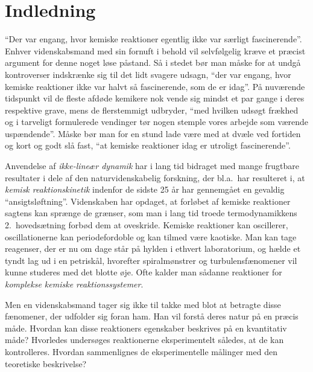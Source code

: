 \chapter*{Indledning}
{\protect{}}
\label{cha:Indledning}
``Der var engang, hvor kemiske reaktioner egentlig ikke var
s{\ae}rligt fasci\-ner\-ende''. Enhver videnskabsmand med sin
fornuft i behold vil selvf{\o}lgelig kr{\ae}ve et
pr{\ae}cist argument for denne noget l{\o}se p{\aa}stand.
S{\aa} i stedet b{\o}r man m{\aa}ske for at undg{\aa}
kontroverser indskr{\ae}nke sig til det lidt svagere
udsagn, ``der var engang, hvor kemiske reaktioner ikke var
halvt s{\aa} fascinerende, som de er idag''. P{\aa}
nuv{\ae}rende tidspunkt vil de fleste afd{\o}de kemikere
nok vende sig mindst et par gange i deres respektive grave,
mens de flerstemmigt udbryder, ``med hvilken uds{\o}gt
fr{\ae}khed og i tarveligt formulerede vendinger t{\o}r
nogen stemple vores arbejde som v{\ae}rende
usp{\ae}ndende''. M{\aa}ske b{\o}r man for en stund lade
v{\ae}re med at dv{\ae}le ved fortiden og kort og godt sl{\aa}
fast, ``at kemiske reaktioner idag er utroligt
fascinerende''.

\vspace{4.0mm}
Anvendelse af {\em ikke-line{\ae}r dynamik\/} har i lang
tid bidraget med mange frugtbare resultater i dele af den
naturvidenskabelig forskning, der bl.a.\ har resulteret i,
at {\em kemisk reaktionskinetik\/} indenfor de sidste 25
{\aa}r har gennemg{\aa}et en gevaldig
``ansigtsl{\o}ftning''. Videnskaben har opdaget, at
forl{\o}bet af kemiske reaktioner sagtens kan spr{\ae}nge
de gr{\ae}nser, som man i lang tid troede termodynamikkens
2.\ hoveds{\ae}tning forb{\o}d dem at oveskride. Kemiske
reaktioner kan oscillerer, oscillationerne kan
periodefordoble og kan tilmed v{\ae}re kaotiske. Man kan
tage reagenser, der er nu om dage st{\aa}r p{\aa} hylden i
ethvert laboratorium, og h{\ae}lde et tyndt lag ud i en
petrisk{\aa}l, hvorefter spiralm{\o}nstrer og
turbulensf{\ae}nomener vil kunne studeres med det blotte
{\o}je. Ofte kalder man s{\aa}danne reaktioner for {\em
komplekse kemiske reaktionssystemer\/}.

\vspace{4.0mm}
Men en videnskabsmand tager sig ikke til takke med blot at
betragte disse f{\ae}nomener, der udfolder sig foran ham.
Han vil forst{\aa} deres natur p{\aa} en pr{\ae}cis
m{\aa}de. Hvordan kan disse reaktioners egenskaber
beskrives p{\aa} en kvantitativ m{\aa}de? Hvorledes
unders{\o}ges reaktionerne eksperimentelt s{\aa}ledes, at
de kan kontrolleres. Hvordan sammenlignes de
eksperimentelle m{\aa}linger med den teoretiske
beskrivelse?

